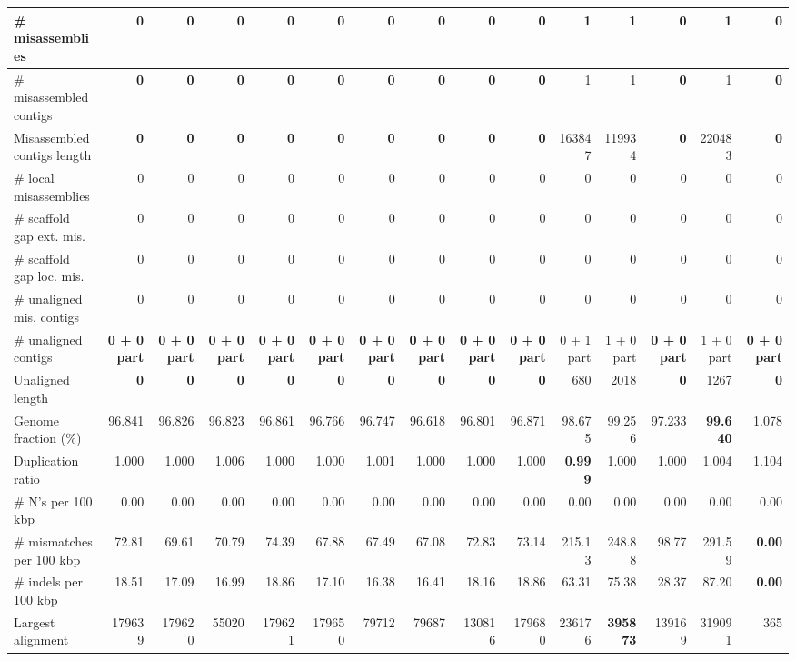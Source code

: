 \documentclass[12pt,a4paper]{article}
\begin{document}
\begin{table}[ht]
\begin{center}
\begin{tabular}{|l*{14}{|r}|}
\# misassemblies & {\bf 0} & {\bf 0} & {\bf 0} & {\bf 0} & {\bf 0} & {\bf 0} & {\bf 0} & {\bf 0} & {\bf 0} & 1 & 1 & {\bf 0} & 1 & {\bf 0} \\ \hline
\# misassembled contigs & {\bf 0} & {\bf 0} & {\bf 0} & {\bf 0} & {\bf 0} & {\bf 0} & {\bf 0} & {\bf 0} & {\bf 0} & 1 & 1 & {\bf 0} & 1 & {\bf 0} \\ \hline
Misassembled contigs length & {\bf 0} & {\bf 0} & {\bf 0} & {\bf 0} & {\bf 0} & {\bf 0} & {\bf 0} & {\bf 0} & {\bf 0} & 163847 & 119934 & {\bf 0} & 220483 & {\bf 0} \\ \hline
\# local misassemblies & 0 & 0 & 0 & 0 & 0 & 0 & 0 & 0 & 0 & 0 & 0 & 0 & 0 & 0 \\ \hline
\# scaffold gap ext. mis. & 0 & 0 & 0 & 0 & 0 & 0 & 0 & 0 & 0 & 0 & 0 & 0 & 0 & 0 \\ \hline
\# scaffold gap loc. mis. & 0 & 0 & 0 & 0 & 0 & 0 & 0 & 0 & 0 & 0 & 0 & 0 & 0 & 0 \\ \hline
\# unaligned mis. contigs & 0 & 0 & 0 & 0 & 0 & 0 & 0 & 0 & 0 & 0 & 0 & 0 & 0 & 0 \\ \hline
\# unaligned contigs & {\bf 0 + 0 part} & {\bf 0 + 0 part} & {\bf 0 + 0 part} & {\bf 0 + 0 part} & {\bf 0 + 0 part} & {\bf 0 + 0 part} & {\bf 0 + 0 part} & {\bf 0 + 0 part} & {\bf 0 + 0 part} & 0 + 1 part & 1 + 0 part & {\bf 0 + 0 part} & 1 + 0 part & {\bf 0 + 0 part} \\ \hline
Unaligned length & {\bf 0} & {\bf 0} & {\bf 0} & {\bf 0} & {\bf 0} & {\bf 0} & {\bf 0} & {\bf 0} & {\bf 0} & 680 & 2018 & {\bf 0} & 1267 & {\bf 0} \\ \hline
Genome fraction (\%) & 96.841 & 96.826 & 96.823 & 96.861 & 96.766 & 96.747 & 96.618 & 96.801 & 96.871 & 98.675 & 99.256 & 97.233 & {\bf 99.640} & 1.078 \\ \hline
Duplication ratio & 1.000 & 1.000 & 1.006 & 1.000 & 1.000 & 1.001 & 1.000 & 1.000 & 1.000 & {\bf 0.999} & 1.000 & 1.000 & 1.004 & 1.104 \\ \hline
\# N's per 100 kbp & 0.00 & 0.00 & 0.00 & 0.00 & 0.00 & 0.00 & 0.00 & 0.00 & 0.00 & 0.00 & 0.00 & 0.00 & 0.00 & 0.00 \\ \hline
\# mismatches per 100 kbp & 72.81 & 69.61 & 70.79 & 74.39 & 67.88 & 67.49 & 67.08 & 72.83 & 73.14 & 215.13 & 248.88 & 98.77 & 291.59 & {\bf 0.00} \\ \hline
\# indels per 100 kbp & 18.51 & 17.09 & 16.99 & 18.86 & 17.10 & 16.38 & 16.41 & 18.16 & 18.86 & 63.31 & 75.38 & 28.37 & 87.20 & {\bf 0.00} \\ \hline
Largest alignment & 179639 & 179620 & 55020 & 179621 & 179650 & 79712 & 79687 & 130816 & 179680 & 236176 & {\bf 395873} & 139169 & 319091 & 365 \\ \hline

\end{tabular}
\end{center}
\end{table}
\end{document}
